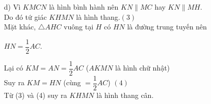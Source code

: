 \begin{bt}
{\begin{enumerate}[c)]
\begin{itemize}
	\end{itemize}
	Do đó $K$ là trung điểm của $AB$ (định lý đường trung bình trong tam giác).\\
	$\Rightarrow KM=\dfrac{1}{2}AC$ \hfill $(1)$\\
	Hoàn toàn tương tự, $N$ cũng là trung điểm của $AC$ nên $NC=\dfrac{1}{2}AC$. \hfill $(2)$\\
	Từ (1) và (2) suy ra $KM=NC$ (cùng bằng $\dfrac{1}{2}AC$) và $KM\parallel NC$ (chứng minh trên).\\
	Vậy tứ giác $KMCN$ là hình bình hành.
	\item[d)] Vì $KMCN$ là hình bình hành nên $KN\parallel MC$ hay $KN\parallel MH$.\\ Do đó tứ giác $KHMN$ là hình thang.\hfill $(3)$\\
	Mặt khác, $\triangle AHC$ vuông tại $H$ có $HN$ là đường trung tuyến nên \begin{center}
		$HN=\dfrac{1}{2}AC$.
	\end{center}
Lại có $KM=AN=\dfrac{1}{2}AC$ ($AKMN$ là hình chữ nhật)\\
Suy ra $KM=HN$ (cùng $=\dfrac{1}{2}AC$) \hfill $(4)$\\
Từ (3) và (4) suy ra $KHMN$ là hình thang cân.
\end{enumerate}	
}
\end{bt}
